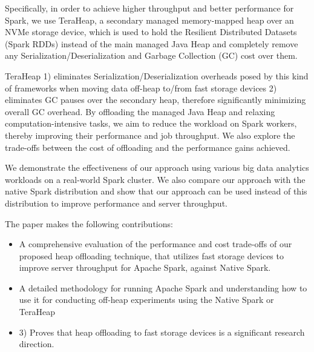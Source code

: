 Specifically, in order to achieve higher throughput and better
performance for Spark, we use TeraHeap, a secondary managed
memory-mapped heap over an NVMe storage device, which is used to hold
the Resilient Distributed Datasets (Spark RDDs) instead of the main
managed Java Heap and completely remove any
Serialization/Deserialization and Garbage Collection (GC) cost over
them.

TeraHeap 1) eliminates Serialization/Deserialization overheads posed
by this kind of frameworks when moving data off-heap to/from fast
storage devices 2) eliminates GC pauses over the secondary heap,
therefore significantly minimizing overall GC overhead. By offloading
the managed Java Heap and relaxing computation-intensive tasks, we aim
to reduce the workload on Spark workers, thereby improving their
performance and job throughput. We also explore the trade-offs between
the cost of offloading and the performance gains achieved.

We demonstrate the effectiveness of our approach using various big
data analytics workloads on a real-world Spark cluster. We also
compare our approach with the native Spark distribution and show that
our approach can be used instead of this distribution to improve
performance and server throughput. 

The paper makes the following contributions: 
\begin{itemize}
    \item{A comprehensive
        evaluation of the performance and cost trade-offs of our proposed heap
        offloading technique, that utilizes fast storage devices to improve
        server throughput for Apache Spark, against Native Spark.
         }
    \item{A detailed methodology for running Apache Spark and
        understanding how to use it for conducting off-heap
        experiments using the Native Spark or TeraHeap }
    \item{3) Proves that heap offloading to fast storage devices is a
        significant research direction. }
\end{itemize}

